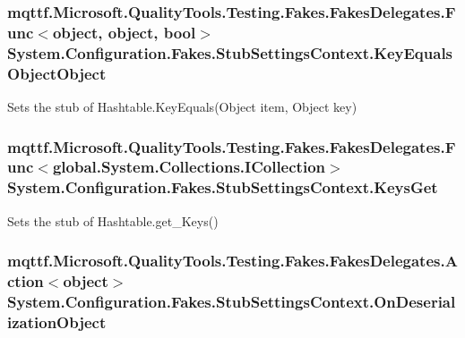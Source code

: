 \hypertarget{class_system_1_1_configuration_1_1_fakes_1_1_stub_settings_context_af8143bd177a31008aef986e20c990121}{
\subsubsection[{Key\-Equals\-Object\-Object}]{\setlength{\rightskip}{0pt plus 5cm}mqttf.\-Microsoft.\-Quality\-Tools.\-Testing.\-Fakes.\-Fakes\-Delegates.\-Func$<$object, object, bool$>$ System.\-Configuration.\-Fakes.\-Stub\-Settings\-Context.\-Key\-Equals\-Object\-Object}}\label{class_system_1_1_configuration_1_1_fakes_1_1_stub_settings_context_af8143bd177a31008aef986e20c990121}


Sets the stub of Hashtable.\-Key\-Equals(\-Object item, Object key)

\hypertarget{class_system_1_1_configuration_1_1_fakes_1_1_stub_settings_context_a8e28be62e338379bf2663bbb4d852a60}{
\subsubsection[{Keys\-Get}]{\setlength{\rightskip}{0pt plus 5cm}mqttf.\-Microsoft.\-Quality\-Tools.\-Testing.\-Fakes.\-Fakes\-Delegates.\-Func$<$global.\-System.\-Collections.\-I\-Collection$>$ System.\-Configuration.\-Fakes.\-Stub\-Settings\-Context.\-Keys\-Get}}\label{class_system_1_1_configuration_1_1_fakes_1_1_stub_settings_context_a8e28be62e338379bf2663bbb4d852a60}


Sets the stub of Hashtable.\-get\-\_\-\-Keys()

\hypertarget{class_system_1_1_configuration_1_1_fakes_1_1_stub_settings_context_a4d21958f197b9984bf3c1178f2a24ab9}{
\subsubsection[{On\-Deserialization\-Object}]{\setlength{\rightskip}{0pt plus 5cm}mqttf.\-Microsoft.\-Quality\-Tools.\-Testing.\-Fakes.\-Fakes\-Delegates.\-Action$<$object$>$ System.\-Configuration.\-Fakes.\-Stub\-Settings\-Context.\-On\-Deserialization\-Object}}\label{class_system_1_1_configuration_1_1_fakes_1_1_stub_settings_context_a4d21958f197b9984bf3c1178f2a24ab9}



